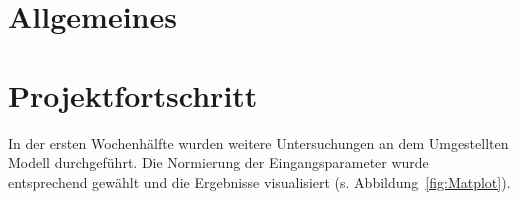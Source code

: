 \documentclass[a4paper,12pt,fleqn]{article}
\begin{document}
\setlength{\headheight}{36pt}

\begin{titlepage}



\end{titlepage}

\section[Allgemeines]{Allgemeines}
%
\section[Fortschritt]{Projektfortschritt}
%
In der ersten Wochenhälfte wurden weitere Untersuchungen an dem Umgestellten Modell durchgeführt. Die Normierung der Eingangsparameter wurde entsprechend gewählt und die Ergebnisse visualisiert (s. Abbildung~\ref{fig:Matplot}).
%

\end{document}
